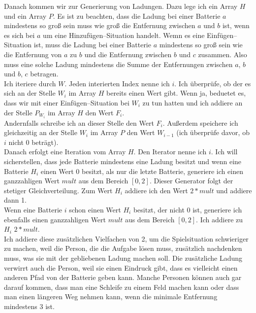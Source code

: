 \documentclass[a4paper,10pt,ngerman]{scrartcl}
\begin{document}
Danach kommen wir zur Generierung von Ladungen. Dazu lege ich ein Array $H$ und ein Array $P$.
Es ist zu beachten, dass die Ladung bei einer Batterie $a$ mindestens so groß sein muss wie groß
die Entfernung zwischen $a$ und $b$ ist, wenn es sich bei $a$ um eine Hinzufügen--Situation handelt.
Wemn es eine Einfügen--Situation ist, muss die Ladung bei einer Batterie $a$ mindestens so groß sein wie
die Entfernung von $a$ zu $b$ und die Entfernung zwischen $b$ und $c$ zusammen. Also muss eine
solche Ladung mindestens die Summe der Entfernungen zwischen $a$, $b$ und $b$, $c$ betragen.\\
Ich iteriere durch $W$. Jeden interierten Index nenne ich $i$.
Ich überprüfe, ob der es sich an der Stelle $W_i$ im Array $H$ bereits einen Wert gibt.
Wenn ja, beduetet es, dass wir mit einer Einfügen--Situation bei $W_i$ zu tun hatten und ich
addiere an der Stelle $P_{W_i}$ im Array $H$ den Wert $F_i$.\\
Andernfalls schreibe ich an dieser Stelle den Wert $F_i$. Außerdem speichere ich gleichzeitig 
an der Stelle $W_i$ im Array $P$ den Wert $W_{i-1}$ (ich überprüfe davor, ob $i$ nicht 0 beträgt).\\
Danach erfolgt eine Iteration vom Array $H$. Den Iterator nenne ich $i$.
Ich will sicherstellen, dass jede Batterie mindestens eine Ladung
besitzt und wenn eine Batterie $H_i$ einen Wert 0 besitzt, als nur die letzte Batterie,
generiere ich einen ganzzahligen Wert $mult$ aus dem Bereich $[0,2]$.
Dieser Generator folgt der stetiger Gleichverteilung.
Zum Wert $H_i$ addiere ich den Wert $2*mult$ und addiere dann 1.\\
Wenn eine Batterie $i$ schon einen Wert $H_i$ besitzt, der nicht 0 ist, generiere ich ebenfalls
einen ganzzahligen Wert $mult$ aus dem Bereich $[0,2]$.
Ich addiere zu $H_i$ $2*mult$.\\
Ich addiere diese zusätzlichen Vielfachen von 2, um die Spielsituation schwieriger zu machen, weil
die Person, die die Aufgabe lösen muss, zusätzlich nachdenken muss, was sie mit der gebliebenen
Ladung machen soll.
Die zusätzliche Ladung verwirrt auch die Person, weil sie einen Eindruck gibt, dass es vielleicht einen anderen
Pfad von der Batterie geben kann. Manche Personen können auch gar darauf kommen, dass man eine Schleife
zu einem Feld machen kann oder dass man einen längeren Weg nehmen kann, wenn die minimale Entfernung mindestens 3 ist.
\end{document}
